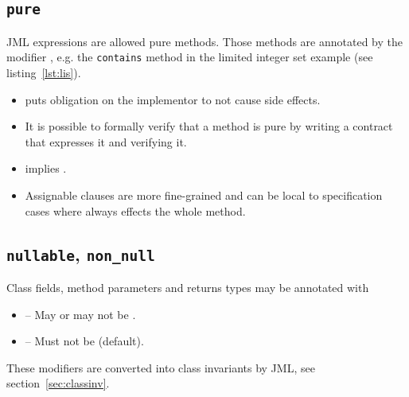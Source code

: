 		\subsection{\texttt{pure}}

			JML expressions are allowed pure methods. Those methods are annotated by the modifier , e.g. the \texttt{contains} method in the limited integer set example (see listing~\ref{lst:lis}).

			\begin{itemize}
				\item {} puts obligation on the implementor to not cause side effects.
				\item It is possible to formally verify that a method is pure by writing a contract that expresses it and verifying it.
				\item {} implies .
				\item Assignable clauses are more fine-grained and can be local to specification cases where  always effects the whole method.
			\end{itemize}

		\subsection{\texttt{nullable}, \texttt{non\_null}}
			Class fields, method parameters and returns types may be annotated with
			\begin{itemize}
				\item {} -- May or may not be .
				\item {}  -- Must not be  (default).
			\end{itemize}


			These modifiers are converted into class invariants by JML, see section~\ref{sec:classinv}.

